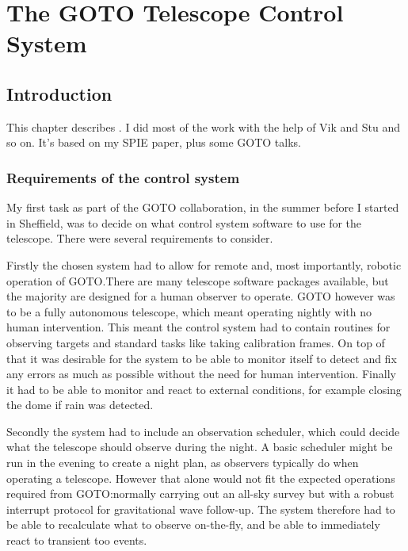 \chapter{The GOTO Telescope Control System}
\label{chap:gtecs}
\chaptoc{}


\newpage
\section{Introduction}
\label{sec:gtecs_intro}
\begin{colsection}


\begin{colsection}

This chapter describes .
I did most of the work with the help of Vik and Stu and so on.
It's based on my SPIE paper, plus some GOTO talks.

\end{colsection}


\subsection{Requirements of the control system}
\label{sec:control_requirements}
\begin{colsection}

My first task as part of the GOTO collaboration, in the summer before I started in Sheffield, was to decide on what control system software to use for the telescope. There were several requirements to consider.

Firstly the chosen system had to allow for remote and, most importantly, robotic operation of GOTO.\@ There are many telescope software packages available, but the majority are designed for a human observer to operate. GOTO however was to be a fully autonomous telescope, which meant operating nightly with no human intervention. This meant the control system had to contain routines for observing targets and standard tasks like taking calibration frames. On top of that it was desirable for the system to be able to monitor itself to detect and fix any errors as much as possible without the need for human intervention. Finally it had to be able to monitor and react to external conditions, for example closing the dome if rain was detected.

Secondly the system had to include an observation scheduler, which could decide what the telescope should observe during the night. A basic scheduler might be run in the evening to create a night plan, as observers typically do when operating a telescope. However that alone would not fit the expected operations required from GOTO:\@ normally carrying out an all-sky survey but with a robust interrupt protocol for gravitational wave follow-up. The system therefore had to be able to recalculate what to observe on-the-fly, and be able to immediately react to transient \gls{too} events.


\end{colsection}
\end{colsection}
